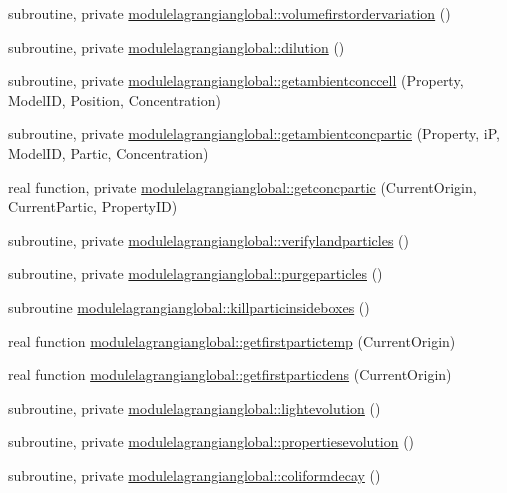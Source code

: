 \begin{DoxyCompactItemize}
\item 
subroutine, private \mbox{\hyperlink{namespacemodulelagrangianglobal_a3b4d2f6226b807632b46704ab7cd6944}{modulelagrangianglobal\+::volumefirstordervariation}} ()
\item 
subroutine, private \mbox{\hyperlink{namespacemodulelagrangianglobal_aa64605bdb86dfab0e679be6775d4e80f}{modulelagrangianglobal\+::dilution}} ()
\item 
subroutine, private \mbox{\hyperlink{namespacemodulelagrangianglobal_a21c98c8cc24ebb92a5b8821af08be797}{modulelagrangianglobal\+::getambientconccell}} (Property, Model\+ID, Position, Concentration)
\item 
subroutine, private \mbox{\hyperlink{namespacemodulelagrangianglobal_a48f3a78b845b645d04afad9baa94ac01}{modulelagrangianglobal\+::getambientconcpartic}} (Property, iP, Model\+ID, Partic, Concentration)
\item 
real function, private \mbox{\hyperlink{namespacemodulelagrangianglobal_a7f334bcd9f4c9e4556c095e5e4ff02b4}{modulelagrangianglobal\+::getconcpartic}} (Current\+Origin, Current\+Partic, Property\+ID)
\item 
subroutine, private \mbox{\hyperlink{namespacemodulelagrangianglobal_ac120fed4d0c01e0966e67e65fb6d05fc}{modulelagrangianglobal\+::verifylandparticles}} ()
\item 
subroutine, private \mbox{\hyperlink{namespacemodulelagrangianglobal_abe2068918e9b300501fc826856caeafa}{modulelagrangianglobal\+::purgeparticles}} ()
\item 
subroutine \mbox{\hyperlink{namespacemodulelagrangianglobal_a8d6c65d3eba55f99706d464f633f31b3}{modulelagrangianglobal\+::killparticinsideboxes}} ()
\item 
real function \mbox{\hyperlink{namespacemodulelagrangianglobal_a19c897c8ad7d0daf71fbab9514077b55}{modulelagrangianglobal\+::getfirstpartictemp}} (Current\+Origin)
\item 
real function \mbox{\hyperlink{namespacemodulelagrangianglobal_a419bd4bef813f469c2fc04f9e386890e}{modulelagrangianglobal\+::getfirstparticdens}} (Current\+Origin)
\item 
subroutine, private \mbox{\hyperlink{namespacemodulelagrangianglobal_a4cefc1989887113dc6c716f228c4772f}{modulelagrangianglobal\+::lightevolution}} ()
\item 
subroutine, private \mbox{\hyperlink{namespacemodulelagrangianglobal_ad41aee81fdf2c272327a709b9f90d33b}{modulelagrangianglobal\+::propertiesevolution}} ()
\item 
subroutine, private \mbox{\hyperlink{namespacemodulelagrangianglobal_a1f9b10a52dd3091e18232addf8002dac}{modulelagrangianglobal\+::coliformdecay}} ()

\end{DoxyCompactItemize}
